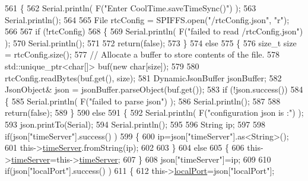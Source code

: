 \begin{DoxyCode}
561 \{
562     Serial.println( F(\textcolor{stringliteral}{"Enter CoolTime.saveTimeSync()"}) );
563     Serial.println();
564 
565     File rtcConfig = SPIFFS.open(\textcolor{stringliteral}{"/rtcConfig.json"}, \textcolor{stringliteral}{"r"});
566 
567     \textcolor{keywordflow}{if} (!rtcConfig) 
568     \{
569         Serial.println( F(\textcolor{stringliteral}{"failed to read /rtcConfig.json"}) );
570         Serial.println();
571 
572         \textcolor{keywordflow}{return}(\textcolor{keyword}{false});
573     \}
574     \textcolor{keywordflow}{else}
575     \{
576         \textcolor{keywordtype}{size\_t} size = rtcConfig.size();
577         \textcolor{comment}{// Allocate a buffer to store contents of the file.}
578         std::unique\_ptr<char[]> buf(\textcolor{keyword}{new} \textcolor{keywordtype}{char}[size]);
579 
580         rtcConfig.readBytes(buf.get(), size);
581         DynamicJsonBuffer jsonBuffer;
582         JsonObject& json = jsonBuffer.parseObject(buf.get());
583         \textcolor{keywordflow}{if} (!json.success()) 
584         \{
585             Serial.println( F(\textcolor{stringliteral}{"failed to parse json"}) );
586             Serial.println();
587 
588             \textcolor{keywordflow}{return}(\textcolor{keyword}{false});
589         \} 
590         \textcolor{keywordflow}{else}
591         \{   
592             Serial.println( F(\textcolor{stringliteral}{"configuration json is :"}) );
593             json.printTo(Serial);
594             Serial.println();
595 
596             String ip;
597                     
598             \textcolor{keywordflow}{if}(json[\textcolor{stringliteral}{"timeServer"}].success() )
599             \{           
600                  ip=json[\textcolor{stringliteral}{"timeServer"}].as<String>();
601                 this->\hyperlink{classCoolTime_ad2b9858f399108cb440dd1e908916f04}{timeServer}.fromString(ip);
602                 
603             \}
604             \textcolor{keywordflow}{else}
605             \{
606                 this->\hyperlink{classCoolTime_ad2b9858f399108cb440dd1e908916f04}{timeServer}=this->\hyperlink{classCoolTime_ad2b9858f399108cb440dd1e908916f04}{timeServer};
607             \}
608             json[\textcolor{stringliteral}{"timeServer"}]=ip;
609             
610             \textcolor{keywordflow}{if}(json[\textcolor{stringliteral}{"localPort"}].success() )
611             \{                       
612                 this->\hyperlink{classCoolTime_a2f777da44d7ba678be8185299e9b49d1}{localPort}=json[\textcolor{stringliteral}{"localPort"}];

\end{DoxyCode}
